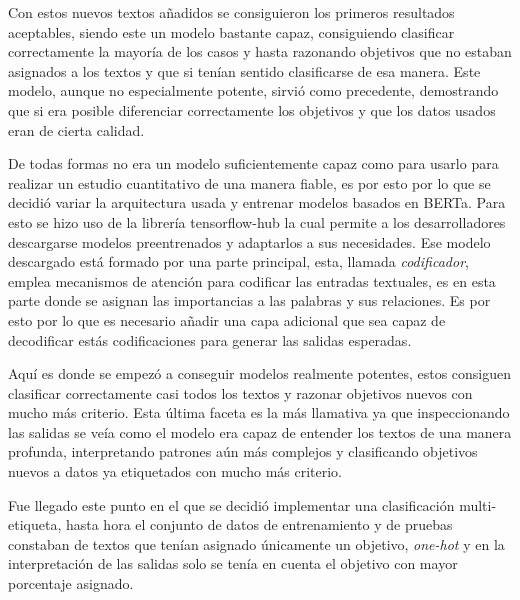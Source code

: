 Con estos nuevos textos añadidos se consiguieron los primeros resultados
aceptables, siendo este un modelo bastante capaz, consiguiendo clasificar
correctamente la mayoría de los casos y hasta razonando objetivos que no estaban
asignados a los textos y que si tenían sentido clasificarse de esa manera. Este modelo, aunque no especialmente potente,
sirvió como precedente, demostrando que si era posible diferenciar correctamente
los objetivos y que los datos usados eran de cierta calidad.

De todas formas no era un modelo suficientemente capaz como para usarlo para
realizar un estudio cuantitativo de una manera fiable, es por esto por lo que se
decidió variar la arquitectura usada y entrenar modelos basados en
\gls{BERTa}. Para esto se hizo uso de la librería tensorflow-hub la cual
permite a los desarrolladores descargarse modelos preentrenados y adaptarlos a
sus necesidades. Ese modelo descargado está formado por una parte principal,
esta, llamada \textit{codificador}, emplea mecanismos de atención para codificar
las entradas textuales, es en esta parte donde se asignan las importancias a las
palabras y sus relaciones. Es por esto por lo que es necesario añadir una capa
adicional que sea capaz de decodificar estás codificaciones para generar las
salidas esperadas. 

Aquí es donde se empezó a conseguir modelos realmente potentes, estos consiguen
clasificar correctamente casi todos los textos y razonar objetivos nuevos con
mucho más criterio. Esta última faceta es la más llamativa ya que inspeccionando
las salidas se veía como el modelo era capaz de entender los textos de una
manera profunda, interpretando patrones aún más complejos y clasificando
objetivos nuevos a datos ya etiquetados con mucho más criterio.


Fue llegado este punto en el que se decidió implementar una clasificación
multi-etiqueta, hasta hora el conjunto de datos de entrenamiento y de pruebas
constaban de textos que tenían asignado únicamente un objetivo, \textit{one-hot}
y en la interpretación de las salidas solo se tenía en cuenta el objetivo con mayor
porcentaje asignado. 


